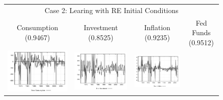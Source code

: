 \begin{figure}
\begin{tabular}{cccc}
\multicolumn{4}{c}{Case 2: Learing with RE Initial Conditions} \\ 
Consumption (0.9467) & Investment (0.8525) & Inflation (0.9235) & Fed Funds (0.9512) \\
\includegraphics[scale=0.22]{results_reallinit/consumption_err.png} & 
\includegraphics[scale=0.22]{results_reallinit/investment_err.png} & 
\includegraphics[scale=0.22]{results_reallinit/inflation_err.png} & 

\end{tabular}
\end{figure}
